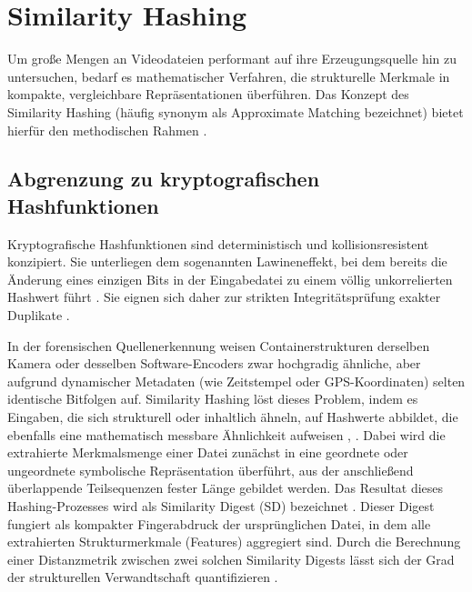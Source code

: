\section{Similarity Hashing}
\label{sec:sh}

Um große Mengen an Videodateien performant auf ihre Erzeugungsquelle hin zu untersuchen, bedarf es mathematischer Verfahren, die strukturelle Merkmale in kompakte, vergleichbare Repräsentationen überführen. Das Konzept des Similarity Hashing (häufig synonym als Approximate Matching bezeichnet) bietet hierfür den methodischen Rahmen \cite[Kap. 2]{breitinger_approximate_2014}.


\subsection{Abgrenzung zu kryptografischen Hashfunktionen}

Kryptografische Hashfunktionen sind deterministisch und kollisionsresistent konzipiert. Sie unterliegen dem sogenannten Lawineneffekt, bei dem bereits die Änderung eines einzigen Bits in der Eingabedatei zu einem völlig unkorrelierten Hashwert führt \cite[Kap. 9]{scott_a_vanstone_alfred_j_menezes_handbook_2018}. Sie eignen sich daher zur strikten Integritätsprüfung exakter Duplikate \cite[Kap. 2]{breitinger_approximate_2014}.

In der forensischen Quellenerkennung weisen Containerstrukturen derselben Kamera oder desselben Software-Encoders zwar hochgradig ähnliche, aber aufgrund dynamischer Metadaten (wie Zeitstempel oder GPS-Koordinaten) selten identische Bitfolgen auf. Similarity Hashing löst dieses Problem, indem es Eingaben, die sich strukturell oder inhaltlich ähneln, auf Hashwerte abbildet, die ebenfalls eine mathematisch messbare Ähnlichkeit aufweisen \cite[Kap. 2.1]{breitinger_approximate_2014}, \cite[Kap. 1]{roussev_data_2010}. Dabei wird die extrahierte Merkmalsmenge einer Datei zunächst in eine geordnete oder ungeordnete symbolische Repräsentation überführt, aus der anschließend überlappende Teilsequenzen fester Länge gebildet werden. Das Resultat dieses Hashing-Prozesses wird als Similarity Digest (SD) bezeichnet \cite[Kap. 2.2]{breitinger_approximate_2014}. Dieser Digest fungiert als kompakter Fingerabdruck der ursprünglichen Datei, in dem alle extrahierten Strukturmerkmale (Features) aggregiert sind. Durch die Berechnung einer Distanzmetrik zwischen zwei solchen Similarity Digests lässt sich der Grad der strukturellen Verwandtschaft quantifizieren \cite[Kap. 3.4]{roussev_data_2010}.

